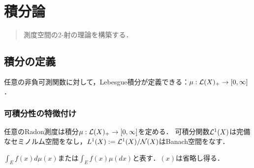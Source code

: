 \documentclass[uplatex, dvipdfmx]{jsreport}
\begin{document}
\chapter{積分論}

\begin{quotation}
    測度空間の2-射の理論を構築する．
\end{quotation}

\section{積分の定義}

\begin{tcolorbox}[colframe=ForestGreen, colback=ForestGreen!10!white,breakable,colbacktitle=ForestGreen!40!white,coltitle=black,fonttitle=\bfseries\sffamily,
title=]
    任意の非負可測関数に対して，Lebesgue積分が定義できる：$\mu:\mathcal{L}(X)_+\to[0,\infty]$．

\end{tcolorbox}

\subsection{可積分性の特徴付け}

\begin{tcolorbox}[colframe=ForestGreen, colback=ForestGreen!10!white,breakable,colbacktitle=ForestGreen!40!white,coltitle=black,fonttitle=\bfseries\sffamily,
title=]
    任意のRadon測度は積分$\mu:\mathcal{L}(X)_+\to[0,\infty]$を定める．
    可積分関数$\mathcal{L}^1(X)$は完備なセミノルム空間をなし，$L^1(X):=\mathcal{L}^1(X)/\mathcal{N}(X)$はBanach空間をなす．
\end{tcolorbox}

\begin{notation}
    $\int_Ef(x)d\mu(x)$または$\int_Ef(x)\mu(dx)$と表す．$(x)$は省略し得る．
\end{notation}
\end{document}
